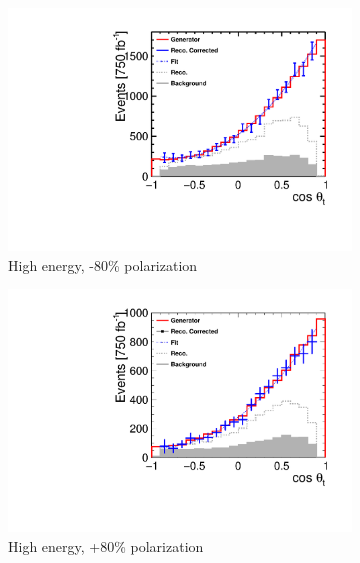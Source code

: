 \begin{figure}[] 
  \begin{subfigure}[]{0.5\linewidth}
    \centering
    \includegraphics[width=0.99\linewidth]{TopAnalysis/figures/ThetaPlots_1200GeVNeg.pdf} 
    \caption{High energy, -80\% polarization} 
    \vspace{4ex}
  \end{subfigure}%
  \begin{subfigure}[]{0.5\linewidth}
    \centering
    \includegraphics[width=0.99\linewidth]{TopAnalysis/figures/ThetaPlots_1200GeVPos.pdf} 
    \caption{High energy, +80\% polarization} 
    \vspace{4ex}
  \end{subfigure} 
  \begin{subfigure}[]{0.5\linewidth}
    \centering

\end{subfigure}
\end{figure}
